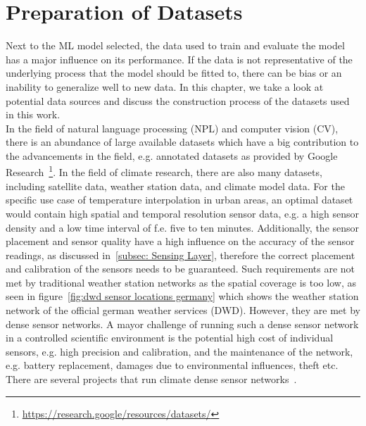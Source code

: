 \chapter{Preparation of Datasets}
\label{chap:preparations data sets}

Next to the ML model selected, the data used to train and evaluate the model has a major influence on its performance. If the data is not representative of the underlying process that the model should be fitted to, there can be bias or an inability to generalize well to new data. In this chapter, we take a look at potential data sources and discuss the construction process of the datasets used in this work.\\
In the field of natural language processing (NPL) and computer vision (CV), there is an abundance of large available datasets which have a big contribution to the advancements in the field, e.g. annotated datasets as provided by Google Research~\footnote{\url{https://research.google/resources/datasets/}}. In the field of climate research, there are also many datasets, including satellite data, weather station data, and climate model data. For the specific use case of temperature interpolation in urban areas, an optimal dataset would contain high spatial and temporal resolution sensor data, e.g. a high sensor density and a low time interval of f.e. five to ten minutes. Additionally, the sensor placement and sensor quality have a high influence on the accuracy of the sensor readings, as discussed in~\ref{subsec: Sensing Layer}, therefore the correct placement and calibration of the sensors needs to be guaranteed. Such requirements are not met by traditional weather station networks as the spatial coverage is too low, as seen in figure~\ref{fig:dwd sensor locations germany} which shows the weather station network of the official german weather services (DWD).
However, they are met by dense sensor networks. A mayor challenge of running such a dense sensor network in a controlled scientific environment is the potential high cost of individual sensors, e.g. high precision and calibration, and the maintenance of the network, e.g. battery replacement, damages due to environmental influences, theft etc. 
There are several projects that run climate dense sensor networks~\cite{muller2013sensors}. %


